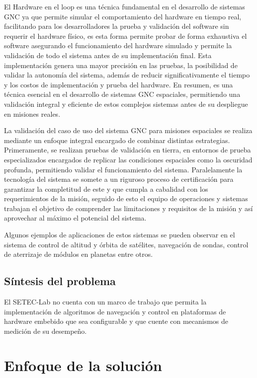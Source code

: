 \documentclass[12pt]{article}
\begin{document}
El Hardware en el loop es una técnica fundamental en el desarrollo de sistemas GNC ya que permite simular el comportamiento del hardware en tiempo real, facilitando para los desarrolladores la prueba y validación del software sin requerir el hardware físico, es esta forma permite probar de forma exhaustiva el software asegurando el funcionamiento del hardware simulado y permite la validación de todo el sistema antes de su implementación final. Esta implementación genera una mayor precisión en las pruebas, la posibilidad de validar la autonomía del sistema, además de reducir significativamente el tiempo y los costos de implementación y prueba del hardware. En resumen, es una técnica esencial en el desarrollo de sistemas GNC espaciales, permitiendo una validación integral y eficiente de estos complejos sistemas antes de su despliegue en misiones reales.

La validación del caso de uso del sistema GNC para misiones espaciales se realiza mediante un enfoque integral encargado de combinar distintas estrategias. Primeramente, se realizan pruebas de validación en tierra, en entornos de prueba especializados encargados de replicar las condiciones espaciales como la oscuridad profunda, permitiendo validar el funcionamiento del sistema. Paralelamente la tecnología del sistema se somete a un riguroso proceso de certificación para garantizar la completitud de este y que cumpla a cabalidad con los requerimientos de la misión, seguido de esto el equipo de operaciones y sistemas trabajan el objetivo de comprender las limitaciones y requisitos de la misión y así aprovechar al máximo el potencial del sistema.

Algunos ejemplos de aplicaciones de estos sistemas se pueden observar en el sistema de control de altitud y órbita de satélites, navegación de sondas, control de aterrizaje de módulos en planetas entre otros. 

\subsection{Síntesis del problema}

El SETEC-Lab no cuenta con un marco de trabajo que permita la implementación de algoritmos de navegación y control en plataformas de hardware embebido que sea configurable y que cuente con mecanismos de medición de su desempeño.

\section{Enfoque de la solución}
\end{document}
